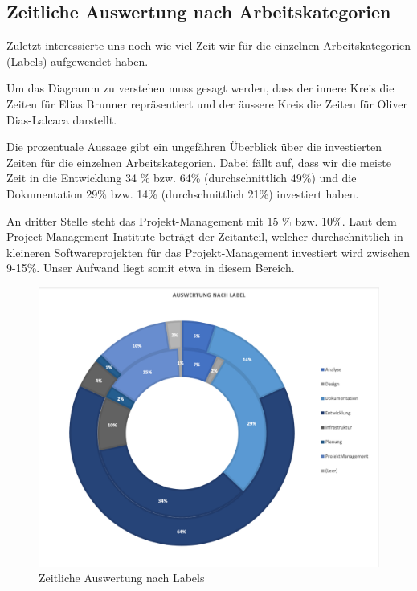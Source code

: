 \subsection{Zeitliche Auswertung nach Arbeitskategorien}
Zuletzt interessierte uns noch wie viel Zeit wir für die einzelnen Arbeitskategorien (Labels) aufgewendet haben.

Um das Diagramm zu verstehen muss gesagt werden, dass der innere Kreis die Zeiten für Elias Brunner repräsentiert und der äussere Kreis die Zeiten für Oliver Dias-Lalcaca darstellt. 

Die prozentuale Aussage gibt ein ungefähren Überblick über die investierten Zeiten für die einzelnen Arbeitskategorien. Dabei fällt auf, dass wir die meiste Zeit in die Entwicklung 34 \% bzw. 64\% (durchschnittlich 49\%) und die Dokumentation 29\% bzw. 14\% (durchschnittlich 21\%) investiert haben.

An dritter Stelle steht das Projekt-Management mit 15 \% bzw. 10\%. Laut dem Project Management Institute \cite{pmi} beträgt der Zeitanteil, welcher durchschnittlich in kleineren Softwareprojekten für das Projekt-Management investiert wird zwischen 9-15\%. Unser Aufwand liegt somit etwa in diesem Bereich. 

\begin{figure}[h]
	\centering
	\includegraphics[width=1\linewidth]{./img/zeitauswertung/ZeitauswertungLabel}
	\caption{Zeitliche Auswertung nach Labels}
	\label{fig:comparison-labels}
\end{figure}